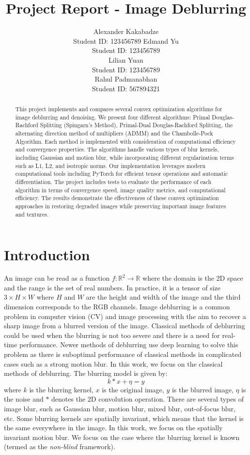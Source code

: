\documentclass{article}
\title{Project Report - Image Deblurring}
\author{%
  Alexander Kakabadze \\
  Student ID: 123456789
  \And
  Edmand Yu \\
  Student ID: 123456789\\
 \AND
 Lilian Yuan\\
 Student ID: 123456789\\
 \And
 Rahul Padmanabhan\\
 Student ID: 567894321\\ 
}
\begin{document}
\maketitle


\begin{abstract}
  This project implements and compares several convex optimization algorithms for image deblurring and denoising.
  We present four different algorithms: Primal Douglas-Rachford Splitting (Spingarn's Method), Primal-Dual Douglas-Rachford Splitting, the alternating direction method of multipliers (ADMM) and the Chambolle-Pock Algorithm.
  Each method is implemented with consideration of computational efficiency and convergence properties.
  The algorithms handle various types of blur kernels, including Gaussian and motion blur, while incorporating different regularization terms such as L1, L2, and isotropic norms.
  Our implementation leverages modern computational tools including PyTorch for efficient tensor operations and automatic differentiation.
  The project includes tests to evaluate the performance of each algorithm in terms of convergence speed, image quality metrics, and computational efficiency.
  The results demonstrate the effectiveness of these convex optimization approaches in restoring degraded images while preserving important image features and textures.
\end{abstract}


\section{Introduction}

An image can be read as a function $f: \mathbb{R}^2 \to \mathbb{R}$ where the domain is the 2D space and the range is the set of real numbers.
In practice, it is a tensor of size $3 \times H \times W$ where $H$ and $W$ are the height and width of the image and the third dimension corresponds to the RGB channels.
Image deblurring is a common problem in computer vision (CV) and image processing with the aim to recover a sharp image from a blurred version of the image.
Classical methods of deblurring could be used when the blurring is not too severe and there is a need for real-time performance.
Newer methods of deblurring use deep learning to solve this problem as there is suboptimal performance of classical methods in complicated cases such as a strong motion blur\cite{al2012comprehensive}.
In this work, we focus on the classical methods of deblurring.
The blurring model is given by:
\begin{equation*}
  k \ast x + \eta = y
\end{equation*}
where $k$ is the blurring kernel, $x$ is the original image, $y$ is the blurred image, $\eta$ is the noise and $\ast$ denotes the 2D convolution operation.
There are several types of image blur, such as Gaussian blur, motion blur, mixed blur, out-of-focus blur, etc.
Some blurring kernels are spatially invariant, which means that the kernel is the same everywhere in the image.
In this work, we focus on the spatially invariant motion blur.
We focus on the case where the blurring kernel is known (termed as the \emph{non-blind} framework).
\end{document}
